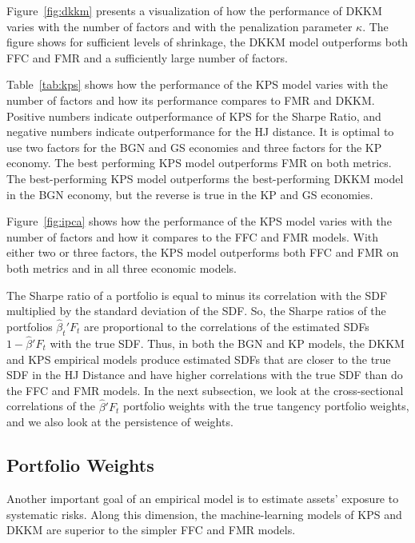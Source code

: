\documentclass[12pt]{scrarticle}
\begin{document}
Figure~\ref{fig:dkkm} presents a visualization of how the performance of DKKM varies with the number of factors and with the penalization parameter $\kappa$.  The figure shows for sufficient levels of shrinkage, the DKKM model outperforms both FFC and FMR and a sufficiently large number of factors.   



Table~\ref{tab:kps} shows how the performance of the KPS model varies with the number of factors and how its performance compares to FMR and DKKM.  Positive numbers indicate outperformance of KPS for the Sharpe Ratio, and negative numbers indicate outperformance for the HJ distance.  It is optimal to use two factors for the BGN and GS economies and three factors for the KP economy.  The best performing KPS model outperforms FMR on both metrics.  The best-performing KPS model outperforms the best-performing DKKM model in the BGN economy, but the reverse is true in the KP and GS economies.

Figure~\ref{fig:ipca} shows how the performance of the KPS model varies with the number of factors and how it compares to the FFC and FMR models.  With either two or three factors, the KPS model outperforms both FFC and FMR on both metrics and in all three economic models.



The Sharpe ratio of a portfolio is equal to minus its correlation with the SDF multiplied by the standard deviation of the SDF.  So, the Sharpe ratios of the portfolios $\hat \beta_t'F_t$ are proportional to the correlations of the estimated SDFs $1-\hat \beta'F_t$ with the true SDF.  Thus, in both the BGN and KP models, the DKKM and KPS empirical models produce estimated SDFs that are closer to the true SDF in the HJ Distance and have higher correlations with the true SDF than do the FFC and FMR models.  In the next subsection, we look at the cross-sectional correlations of the $\hat \beta'F_t$ portfolio weights with the true tangency portfolio weights, and we also look at the persistence of weights.

\subsection{Portfolio Weights} 

Another important goal of an empirical model is to estimate assets' exposure to systematic risks. Along this dimension, the machine-learning models of KPS and DKKM are superior to the simpler FFC and FMR models.
\end{document}
